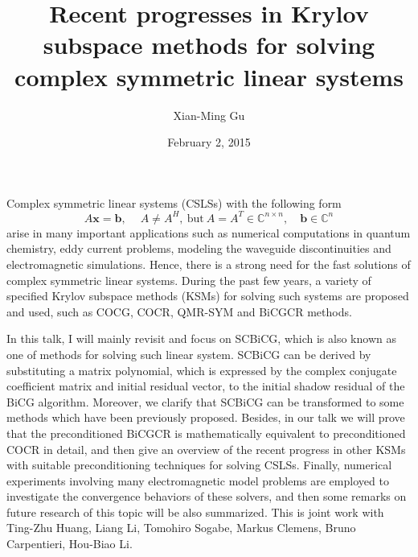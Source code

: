 \documentclass{article}
\title{Recent progresses in Krylov subspace methods for solving complex symmetric linear systems}
\author{Xian-Ming Gu}
\affil{PhD student at Rijksuniversiteit Groningen and University of Electronic Science and Technology of China}
\date{February 2, 2015}
\begin{document}
\maketitle
\setcounter{page}{5}
Complex symmetric linear systems (CSLSs) with the following form
\begin{equation*}
A{\bm x} = {\bm b}, \quad\ A\neq A^H,\ \mathrm{but}\ A = A^T \in
\mathbb{C}^{n\times n},\quad {\bm b}\in \mathbb{C}^n
\end{equation*}
arise in many important applications such as numerical computations
in quantum chemistry, eddy current problems, modeling the waveguide
discontinuities and electromagnetic simulations. Hence, there is a
strong need for the fast solutions of complex symmetric linear systems.
During the past few years, a variety of specified Krylov subspace methods
(KSMs) for solving such systems are proposed and used, such as COCG, COCR,
QMR-SYM and BiCGCR methods.

In this talk, I will mainly revisit and focus on SCBiCG, which is also
known as one of methods for solving such linear system. SCBiCG can be
derived by substituting a matrix polynomial, which is expressed by the
complex conjugate coefficient matrix and initial residual vector, to
the initial shadow residual of the BiCG algorithm. Moreover, we clarify
that SCBiCG can be transformed to some methods which have been previously
proposed. Besides, in our talk we will prove that the preconditioned BiCGCR
is mathematically equivalent to preconditioned COCR in detail, and then give
an overview of the recent progress in other KSMs with suitable preconditioning
techniques for solving CSLSs. Finally, numerical experiments involving many
electromagnetic model problems are employed to investigate the convergence
behaviors of these solvers, and then some remarks on future research of this
topic will be also summarized.
\newline
\newline
\indent This is joint work with Ting-Zhu Huang, Liang Li, Tomohiro Sogabe,
Markus Clemens, Bruno Carpentieri, Hou-Biao Li.
\end{document}
